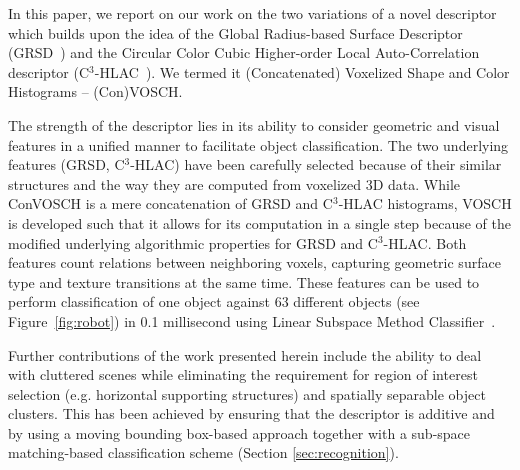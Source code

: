 \documentclass[letterpaper, 10 pt, conference]{sty/ieeeconf}
\begin{document}
In this paper, we report on our work on the two variations of a novel descriptor
which builds upon the idea of the
Global Radius-based Surface Descriptor (GRSD~\cite{GRSD10Humanoids}) and the
Circular Color Cubic Higher-order Local Auto-Correlation descriptor (C$^3$-HLAC~\cite{kanezaki2011icra}).
We termed it (Concatenated) Voxelized Shape and Color Histograms -- (Con)VOSCH.


The strength of the descriptor lies in its ability to consider geometric and
visual features in a unified manner to facilitate object classification. The two
underlying features (GRSD, C$^3$-HLAC) have been carefully selected because of 
their similar structures and the way they are computed from voxelized 3D data. 
While ConVOSCH is a mere concatenation of GRSD and C$^3$-HLAC histograms, 
VOSCH is developed such that it allows for its computation in a single step because 
of the modified underlying algorithmic properties for GRSD and C$^3$-HLAC. 
Both features count relations between neighboring voxels, capturing geometric 
surface type and texture transitions at the same time.
These features can be used to perform classification of one object against 63 
different objects (see Figure~\ref{fig:robot}) in 0.1 millisecond using Linear
Subspace Method Classifier~\cite{watanabe1973}.

Further contributions of the work presented herein include the ability to deal with
cluttered scenes while eliminating the requirement for region of interest
selection (e.g. horizontal supporting structures) and spatially separable object
clusters. This has been achieved by ensuring that the descriptor is additive and by using a
moving bounding box-based approach together with a sub-space matching-based classification scheme (Section
\ref{sec:recognition}). 


\end{document}
